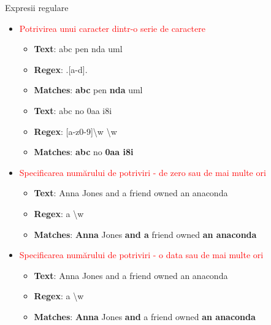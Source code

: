\documentclass[pdf]{beamer}
\begin{document}
\begin{frame}{Expresii regulare}
\begin{itemize}
\item \textcolor{red}{Potrivirea unui caracter dintr-o serie de caractere}
\begin{itemize}
\item
\textbf{Text}:	abc pen nda uml
\item
\textbf{Regex}:		.[a-d].
\item
\textbf{Matches}:	\textbf{abc} pen \textbf{nda} uml
\newline
\item
\textbf{Text}:		abc no 0aa i8i
\item
\textbf{Regex}:		[a-z0-9]\textbackslash w \textbackslash w
\item
\textbf{Matches}:	\textbf{abc} no \textbf{0aa i8i}
\end{itemize}

\item \textcolor{red}{Specificarea numărului de potriviri - de zero sau de mai multe ori}
\begin{itemize}
\item
\textbf{Text}: Anna Jones and a friend owned an anaconda
\item
\textbf{Regex}: a \textbackslash w\text{*}
\item
\textbf{Matches}: \textbf{Anna} Jones \textbf{and a} friend owned \textbf{an anaconda}
\end{itemize}

\item \textcolor{red}{Specificarea numărului de potriviri - o data sau de mai multe ori}
\begin{itemize}
\item
\textbf{Text}: Anna Jones and a friend owned an anaconda
\item
\textbf{Regex}: a \textbackslash w\text{+}
\item
\textbf{Matches}: \textbf{Anna} Jones \textbf{and} a friend owned \textbf{an anaconda}
\end{itemize}
\end{itemize}
\end{frame}
\end{document}
